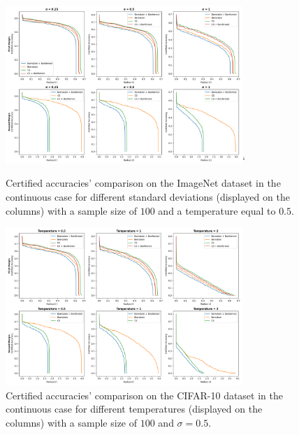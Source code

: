 \begin{figure}[htbp]
    \centering
    \includegraphics[width=0.8\textwidth]{images/cont_sigma_imagenet}`
    \caption{Certified accuracies' comparison on the ImageNet dataset in the continuous case for different standard deviations (displayed on the columns) with a sample size of $100$ and a temperature equal to $0.5$.}
    \label{fig:cont_sigma_imagenet}
\end{figure}
\begin{figure}[htbp]
    \centering
    \includegraphics[width=0.8\textwidth]{images/cont_temp_imagenet}
    \caption{Certified accuracies' comparison on the CIFAR-10 dataset in the continuous case for different temperatures (displayed on the columns) with a sample size of $100$ and $\sigma = 0.5$.}
    \label{fig:cont_temp_imagenet}
\end{figure}
